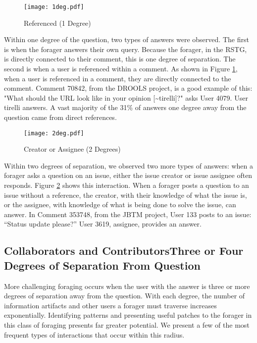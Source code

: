 \begin{figure}[ht]
	\centering
	\texttt{[image: 1deg.pdf]}
	\caption{Referenced (1 Degree)}
	\label{fig:1deg}
\end{figure}

Within one degree of the question, two types of answers were observed. The first is when the forager answers their own query. Because the forager, in the RSTG, is directly connected to their comment, this is one degree of separation. The second is when a user is referenced within a comment. As shown in Figure \ref{fig:1deg}, when a user is referenced in a comment, they are directly connected to the comment. Comment 70842, from the DROOLS project, is a good example of this: "What should the URL look like in your opinion [\textasciitilde tirelli]?" asks User 4079. User tirelli answers. A vast majority of the 31\% of answers one degree away from the question came from direct references.

\begin{figure}[ht]
	\centering
	\texttt{[image: 2deg.pdf]}
	\caption{Creator or Assignee (2 Degrees)}
	\label{fig:2deg}
\end{figure}

Within two degrees of separation, we observed two more types of answers: when a forager asks a question on an issue, either the issue creator or issue assignee often responds. Figure \ref{fig:2deg} shows this interaction. When a forager posts a question to an issue without a reference, the creator, with their knowledge of what the issue is, or the assignee, with knowledge of what is being done to solve the issue, can answer. In Comment 353748, from the JBTM project, User 133 posts to an issue: ``Status update please?'' User 3619, assignee, provides an answer.

\subsection{Collaborators and Contributors\textemdash Three or Four Degrees of Separation From Question}
More challenging foraging occurs when the user with the answer is three or more degrees of separation away from the question. With each degree, the number of information artifacts and other users a forager must traverse increases exponentially. Identifying patterns and presenting useful patches to the forager in this class of foraging presents far greater potential. We present a few of the most frequent types of interactions that occur within this radius. 

